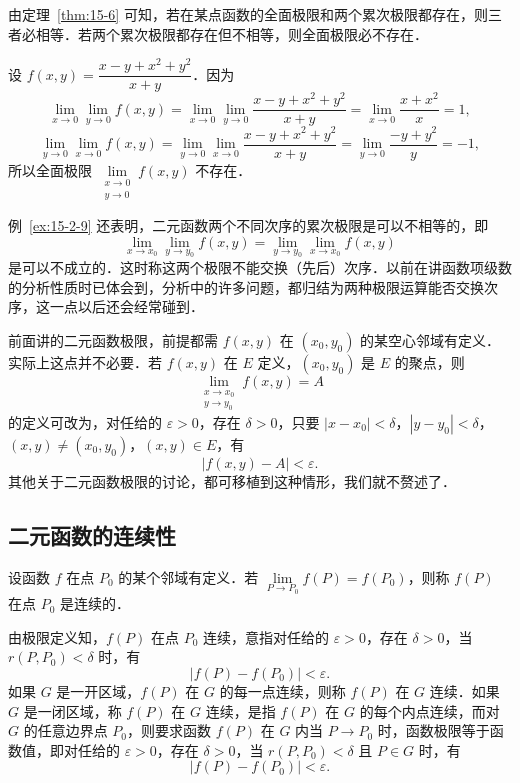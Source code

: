 由定理~\ref{thm:15-6} 可知，若在某点函数的全面极限和两个累次极限都存在，则三者必相等．若两个累次极限都存在但不相等，则全面极限必不存在．

\begin{example}\label{ex:15-2-9}
设 $f(x,y)=\dfrac{x-y+x^{2}+y^{2}}{x+y}$．因为
\[
\lim_{x\to0}\lim_{y\to0}f(x,y)=\lim_{x\to0}\lim_{y\to0}\dfrac{x-y+x^{2}+y^{2}}{x+y}=\lim_{x\to0}\dfrac{x+x^{2}}{x}=1,
\]
\[
\lim_{y\to0}\lim_{x\to0}f(x,y)=\lim_{y\to0}\lim_{x\to0}\dfrac{x-y+x^{2}+y^{2}}{x+y}=\lim_{y\to0}\dfrac{-y+y^{2}}{y}=-1,
\]
所以全面极限 $\lim\limits_{\substack{x\to0\\y\to0}}f(x,y)$ 不存在．
\end{example}

例~\ref{ex:15-2-9} 还表明，二元函数两个不同次序的累次极限是可以不相等的，即
\[
\lim_{x\to x_{0}}\lim_{y\to y_{0}}f(x,y)=\lim_{y\to y_{0}}\lim_{x\to x_{0}}f(x,y)
\]
是可以不成立的．这时称这两个极限不能交换（先后）次序．以前在讲函数项级数的分析性质时已体会到，分析中的许多问题，都归结为两种极限运算能否交换次序，这一点以后还会经常碰到．

前面讲的二元函数极限，前提都需 $f(x,y)$ 在 $(x_{0},y_{0})$ 的某空心邻域有定义．实际上这点并不必要．若 $f(x,y)$ 在 $E$ 定义，$(x_{0},y_{0})$ 是 $E$ 的聚点，则
\[
\lim_{\substack{x\to x_{0}\\ y\to y_{0}}}f(x,y)=A
\]
的定义可改为，对任给的 $\varepsilon>0$，存在 $\delta>0$，只要 $\left|x-x_{0}\right|<\delta$，$\left|y-y_{0}\right|<\delta$，$(x,y)\neq(x_{0},y_{0})$，$(x,y)\in E$，有
\[
\left|f(x,y)-A\right|<\varepsilon.
\]
其他关于二元函数极限的讨论，都可移植到这种情形，我们就不赘述了．

\subsection{二元函数的连续性}

\begin{definition}\label{def:15-6}
设函数 $f$ 在点 $P_{0}$ 的某个邻域有定义．若 $\lim\limits_{P\to P_{0}}f(P)=f(P_{0})$，则称 $f(P)$ 在点 $P_{0}$ 是连续的．
\end{definition}

由极限定义知，$f(P)$ 在点 $P_{0}$ 连续，意指对任给的 $\varepsilon>0$，存在 $\delta>0$，当 $r(P,P_{0})<\delta$ 时，有
\[
\left|f(P)-f(P_{0})\right|<\varepsilon.
\]
如果 $G$ 是一开区域，$f(P)$ 在 $G$ 的每一点连续，则称 $f(P)$ 在 $G$ 连续．如果 $G$ 是一闭区域，称 $f(P)$ 在 $G$ 连续，是指 $f(P)$ 在 $G$ 的每个内点连续，而对 $G$ 的任意边界点 $P_{0}$，则要求函数 $f(P)$ 在 $G$ 内当 $P\to P_{0}$ 时，函数极限等于函数值，即对任给的 $\varepsilon>0$，存在 $\delta>0$，当 $r(P,P_{0})<\delta$ 且 $P\in G$ 时，有
\[
\left|f(P)-f(P_{0})\right|<\varepsilon.
\]

